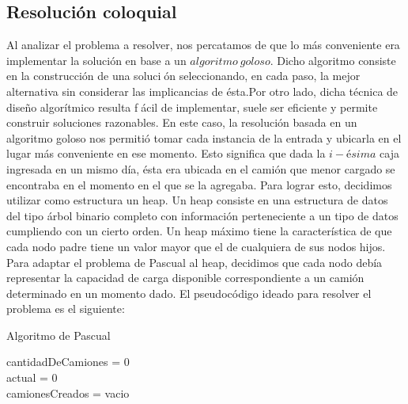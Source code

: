 \subsection{Resolución coloquial}
Al analizar el problema a resolver, nos percatamos de que lo más conveniente era implementar la solución en base a un $algoritmo\ goloso$. Dicho algoritmo consiste en la construcción de una solución seleccionando, en cada paso, la mejor alternativa sin considerar las implicancias de ésta.\newline Por otro lado, dicha técnica de diseño algorítmico resulta fácil de implementar, suele ser eficiente y permite construir soluciones razonables.\newline
\newline
En este caso, la resolución basada en un algoritmo goloso nos permitió tomar cada instancia de la entrada y ubicarla en el lugar más conveniente en ese momento. Esto significa que dada la $i-ésima$ caja ingresada en un mismo día, ésta era ubicada en el camión que menor cargado se encontraba en el momento en el que se la agregaba. Para lograr esto, decidimos utilizar como estructura un heap.\newline
\newline
Un heap consiste en una estructura de datos del tipo árbol binario completo con información perteneciente a un tipo de datos cumpliendo con un cierto orden. Un heap máximo tiene la característica de que cada nodo padre tiene un valor mayor que el de cualquiera de sus nodos hijos.\newline
Para adaptar el problema de Pascual al heap, decidimos que cada nodo debía representar la capacidad de carga disponible correspondiente a un camión determinado en un momento dado.\newline
\newline
El pseudocódigo ideado para resolver el problema es el siguiente:\newline

\begin{algorithm}[H]
	\SetAlgoLined
	\caption{Algoritmo de Pascual}
	cantidadDeCamiones = 0\\
	actual = 0\\
	camionesCreados = vacio\\
\end{algorithm}

